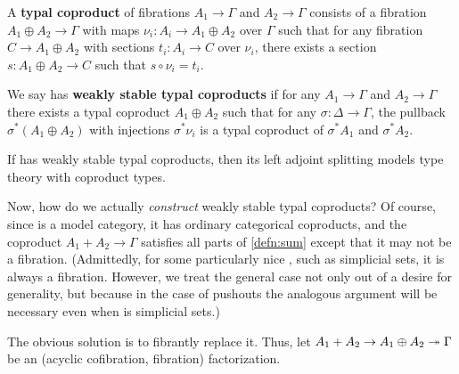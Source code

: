 \begin{defn}\label{defn:sum}
  A \textbf{typal coproduct} of fibrations $A_1\to \Gamma$ and $A_2\to\Gamma$ consists of a fibration $A_1\oplus A_2 \to\Gamma$ with maps $\nu_i: A_i \to A_1\oplus A_2$ over $\Gamma$ such that for any fibration $C\to A_1\oplus A_2$ with sections $t_i : A_i \to C$ over $\nu_i$, there exists a section $s:A_1\oplus A_2 \to C$ such that $s\circ \nu_i = t_i$.

  We say \sM has \textbf{weakly stable typal coproducts} if for any $A_1\to \Gamma$ and $A_2\to\Gamma$ there exists a typal coproduct $A_1\oplus A_2$ such that for any $\sigma:\Delta\to\Gamma$, the pullback $\sigma^*(A_1\oplus A_2)$ with injections $\sigma^*\nu_i$ is a typal coproduct of $\sigma^*A_1$ and $\sigma^* A_2$.
\end{defn}

\begin{thm}
  If \sM has weakly stable typal coproducts, then its left adjoint splitting models type theory with coproduct types.
\end{thm}

Now, how do we actually \emph{construct} weakly stable typal coproducts?
Of course, since \sM is a model category, it has ordinary categorical coproducts, and the coproduct $A_1 + A_2 \to \Gamma$ satisfies all parts of \cref{defn:sum} except that it may not be a fibration.
(Admittedly, for some particularly nice \sM, such as simplicial sets, it is always a fibration.
However, we treat the general case not only out of a desire for generality, but because in the case of pushouts the analogous argument will be necessary even when \sM is simplicial sets.)

The obvious solution is to fibrantly replace it.
Thus, let $A_1 + A_2 \to A_1\oplus A_2 \twoheadrightarrow \Gamma$ be an (acyclic cofibration, fibration) factorization.


